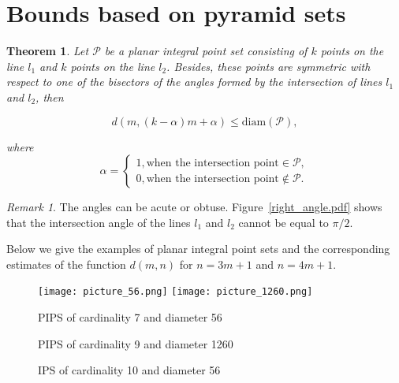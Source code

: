 \documentclass[12pt]{article}
\theoremstyle{theorem}
\newtheorem{theorem}{Theorem}
\theoremstyle{dfn}
\theoremstyle{remark}
\newtheorem{remark}{Remark}
\begin{document}
\section{Bounds based on pyramid sets}

\begin{theorem}
Let $\mathcal{P}$ be a planar integral point set consisting of $k$
points on the line $l_{1}$ and $k$ points on the line $l_{2}$. Besides, these
points are symmetric with respect to one of the bisectors of the angles
formed by the intersection of lines $l_{1}$ and $l_{2}$, then

\begin{equation}\label{formula2}
d(m, (k - \alpha)m + \alpha) \leq \operatorname{diam(\mathcal{P})},
\end{equation}

where
\begin{equation*}
\alpha =
\begin{cases}
1, \text{when the intersection point} \in \mathcal{P}, \\
0, \text{when the intersection point} \notin \mathcal{P}.
\end{cases}
\end{equation*}

\end{theorem}

\begin{remark}
The angles can be acute or obtuse. Figure~\ref{right_angle.pdf} shows that the intersection angle of the lines $l_{1}$ and $l_{2}$ cannot be equal to ${\pi}/2$.
\end{remark}

Below we give the examples of planar integral point sets and the corresponding
estimates of the function $d(m, n)$ for $n = 3m + 1$ and $n = 4m + 1$.

\begin{figure}[htbp]
	\texttt{[image: picture\_56.png]}
	\hfill
	\texttt{[image: picture\_1260.png]}
	\\
	\parbox{.48\linewidth}{\caption{PIPS of cardinality 7 and diameter 56}
	\label{picture_56.png}}
	\hfill
	\parbox{.48\linewidth}{\caption{PIPS of cardinality 9 and diameter 1260}
	\label{picture_1260.png}}
\end{figure}

\begin{figure}[h!]
\parbox{1\linewidth}{\caption{IPS of cardinality 10 and diameter 56}
\label{picture_12.pdf}}
\end{figure}
\end{document}
